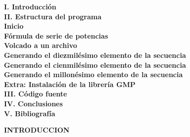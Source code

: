 \documentclass[letterpaper]{article}
\begin{document}
\begin{flushleft}
\textbf{\LARGE I. Introducci\'on\\}
\vspace{0.5cm}
\textbf{\LARGE II. Estructura del programa\\}
\hspace{1.5cm}\textbf{\Large Inicio\\}
\hspace{1.5cm}\textbf{\Large F\'ormula de serie de potencias\\}
\hspace{1.5cm}\textbf{\Large Volcado a un archivo\\}
\hspace{1.5cm}\textbf{\Large Generando el diezmil\'esimo elemento de la secuencia\\}
\hspace{1.5cm}\textbf{\Large Generando el cienmil\'esimo elemento de la secuencia\\}
\hspace{1.5cm}\textbf{\Large Generando el millon\'esimo elemento de la secuencia\\}
\hspace{1.5cm}\textbf{\Large Extra: Instalaci\'on de la librer\'ia GMP\\}
\vspace{0.5cm}
\textbf{\LARGE III. C\'odigo fuente\\}
\vspace{0.5cm}
\textbf{\LARGE IV. Conclusiones\\}
\vspace{0.5cm}
\textbf{\LARGE V. Bibliograf\'ia\\}
\end{flushleft}

\clearpage

\begin{center}
\textbf{\LARGE INTRODUCCION\\}
\vspace{1.0cm}
\end{center}
\end{document}
